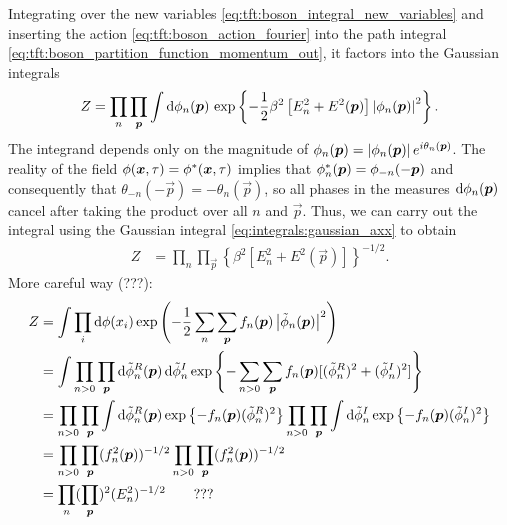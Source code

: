 Integrating over the new variables \eqref{eq:tft:boson_integral_new_variables} and inserting the action \eqref{eq:tft:boson_action_fourier} into the path integral \eqref{eq:tft:boson_partition_function_momentum_out}, it factors into the Gaussian integrals
\begin{equation}
\begin{split}
	Z & =
	\prod_{n} \prod_{{\bm{p}}}
	\int \mathop{}\!\mathrm{d} \phi_n({\bm{p}}) \,
	\exp \left\{
		-\frac12 \beta^2 \left[
			E_n^2 + E^2({\bm{p}})
		\right]
		\left\lvert \phi_n({\bm{p}}) \right\rvert^2
	\right\} . \\
\end{split}
\label{eq:tft:boson_gaussian_integral}
\end{equation}
The integrand depends only on the magnitude of $\phi_n({\bm{p}}) = \left\lvert \phi_n({\bm{p}}) \right\rvert e^{i \theta_n({\bm{p}})}$.
The reality of the field $\phi({\bm{x}}, \tau) = {\phi}^*({\bm{x}}, \tau)$ implies that ${\phi}^*_n({\bm{p}}) = \phi_{-n}(-{\bm{p}})$ and consequently that $\theta_{-n}(-\vec{p}) = -\theta_n(\vec{p})$, so all phases in the measures $\mathop{}\!\mathrm{d} \phi_n({\bm{p}})$ cancel after taking the product over all $n$ and $\vec{p}$.
Thus, we can carry out the integral using the Gaussian integral \eqref{eq:integrals:gaussian_axx} to obtain
\begin{equation}
\begin{split}
	Z & =
	\prod_{n} \prod_{\vec{p}} \left\{
		\beta^2 \left[
			E_n^2 + E^2(\vec{p})
		\right]
	\right\}^{-1/2} .
\end{split}
\end{equation}
\iffalse
More careful way (???):
\begin{equation}
\begin{split}
	Z &= \int \prod_i \mathop{}\!\mathrm{d} \phi(x_i) \exp \left( -\frac12 \sum_n \sum_{\bm{p}} f_n({\bm{p}}) \left\lvert \tilde\phi_n({\bm{p}}) \right\rvert^2 \right) \\
	  &= \int \prod_{n>0} \prod_{\bm{p}} \mathop{}\!\mathrm{d} \tilde\phi_n^R({\bm{p}}) \mathop{}\!\mathrm{d} \tilde\phi_n^I \exp \left\{ -\sum_{n>0} \sum_{\bm{p}} f_n({\bm{p}}) [(\tilde\phi_n^R)^2 + (\tilde\phi_n^I)^2] \right\} \\
	  &= \prod_{n>0} \prod_{\bm{p}} \int \mathop{}\!\mathrm{d} \tilde\phi_n^R({\bm{p}}) \exp \left\{ -f_n({\bm{p}}) (\tilde\phi_n^R)^2 \right\} \prod_{n>0} \prod_{\bm{p}} \int \mathop{}\!\mathrm{d} \tilde\phi_n^I \exp \left\{ -f_n({\bm{p}}) (\tilde\phi_n^I)^2 \right\} \\
	  &= \prod_{n>0} \prod_{\bm{p}} (f^2_n({\bm{p}}))^{-1/2} \prod_{n>0} \prod_{\bm{p}} (f^2_n({\bm{p}}))^{-1/2} \\
	  &= \prod_n (\prod_{\bm{p}})^2 (E_n^2)^{-1/2} \qquad \text{???} \\
\end{split}
\end{equation}
